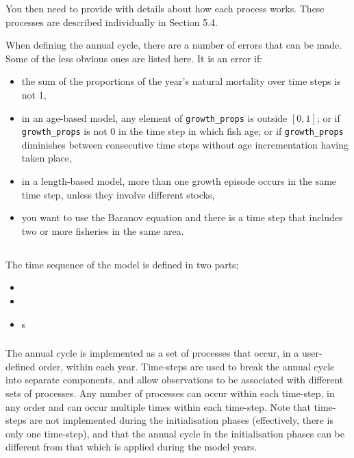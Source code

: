 You then need to provide \CNAME with details about how each process works. These processes are described individually in Section 5.4. 

When defining the annual cycle, there are a number of errors that can be made. Some of the less obvious ones are listed here. It is an error if: 

\begin{itemize}
\item	the sum of the proportions of the year’s natural mortality over time steps is not 1,
\item	in an age-based model, any element of \texttt{growth\_props} is outside $[0,1]$; or if \texttt{growth\_props} is not 0 in the time step in which fish age; or if \texttt{growth\_props} diminishes between consecutive time steps without age incrementation having taken place,
\item	in a length-based model, more than one growth episode occurs in the same time step, unless they involve different stocks,
\item  you want to use the Baranov equation and there is a time step that includes two or more fisheries in the same area.
\end{itemize}


\subsection{}

The time sequence of the model is defined in two parts;
\begin{itemize}
  \item {}
  \item {}
  \item {}s
\end{itemize}

\subsubsection{}

The annual cycle is implemented as a set of processes that occur, in a user-defined order, within each year. Time-steps are used to break the annual cycle into separate components, and allow observations to be associated with different sets of processes. Any number of processes can occur within each time-step, in any order and can occur multiple times within each time-step. Note that time-steps are not implemented during the initialisation phases (effectively, there is only one time-step), and that the annual cycle in the initialisation phases can be different from that which is applied during the model years.

